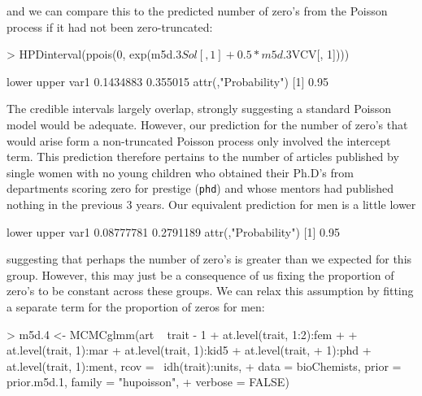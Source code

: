 \documentclass{article}
\begin{document}
and we can compare this to the predicted number of zero's from the Poisson process if it had not been zero-truncated:

\begin{Schunk}
\begin{Sinput}
> HPDinterval(ppois(0, exp(m5d.3$Sol[, 1] + 0.5 * m5d.3$VCV[, 1])))
\end{Sinput}
\begin{Soutput}
         lower    upper
var1 0.1434883 0.355015
attr(,"Probability")
[1] 0.95
\end{Soutput}
\end{Schunk}

The credible intervals largely overlap, strongly suggesting a standard Poisson model would be adequate. However, our prediction for the number of zero's that would arise form a non-truncated Poisson process only involved the intercept term. This prediction therefore pertains to the number of articles published by single women with no young children who obtained their Ph.D's from departments scoring zero for prestige (\texttt{phd}) and whose mentors had published nothing in the previous 3 years.  Our equivalent prediction for men is a little lower 

\begin{Schunk}
\begin{Soutput}
          lower     upper
var1 0.08777781 0.2791189
attr(,"Probability")
[1] 0.95
\end{Soutput}
\end{Schunk}

suggesting that perhaps the number of zero's is greater than we expected for this group. However, this may just be a consequence of us fixing the proportion of zero's to be constant across these groups. We can relax this assumption by fitting a separate term for the proportion of zeros for men:

\begin{Schunk}
\begin{Sinput}
> m5d.4 <- MCMCglmm(art ~ trait - 1 + at.level(trait, 1:2):fem + 
+     at.level(trait, 1):mar + at.level(trait, 1):kid5 + at.level(trait, 
+     1):phd + at.level(trait, 1):ment, rcov = ~idh(trait):units, 
+     data = bioChemists, prior = prior.m5d.1, family = "hupoisson", 
+     verbose = FALSE)
\end{Sinput}
\end{Schunk}
\end{document}
